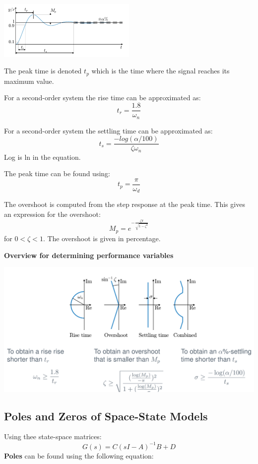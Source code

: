 \begin{center}
	\includegraphics[width=0.5\textwidth]{Images/performance.png}
\end{center}

The peak time is denoted $t_p$ which is the time where the signal reaches its maximum value.

For a second-order system the rise time can be approximated as:
$$t_r = \frac{1.8}{\omega_n}$$

For a second-order system the settling time can be approximated as:
$$t_s = \frac{-log(\alpha/100)}{\zeta \omega_n}$$
Log is ln in the equation.

The peak time can be found using:
$$t_p = \frac{\pi}{\omega_d}$$

The overshoot is computed from the step response at the peak time. This gives
an expression for the overshoot:
$$M_p = e^{-\frac{\zeta \pi}{\sqrt{1-\zeta^2}}}$$
for $0<\zeta<1$. The overshoot is given in percentage.


\textbf{Overview for determining performance variables}
\begin{center}
	\includegraphics[width=\textwidth]{Images/perfSpec.png}
\end{center}


\subsection{Poles and Zeros of Space-State Models}
Using thee state-space matrices:
$$G(s) = C(sI-A)^{-1}B+D$$
\textbf{Poles} can be found using the following equation:

